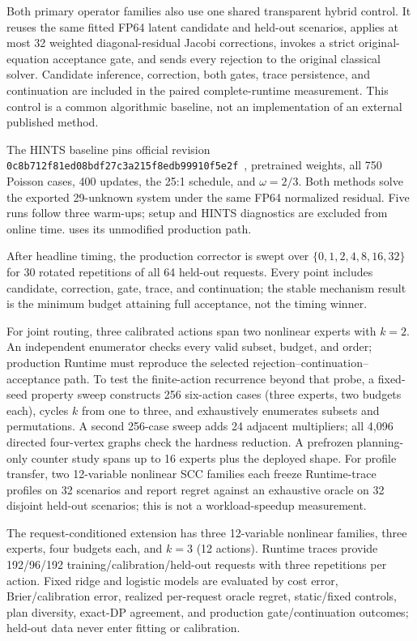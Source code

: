 Both primary operator families also use one shared transparent hybrid control. It
reuses the same fitted FP64 latent candidate and held-out scenarios, applies at most
32 weighted diagonal-residual Jacobi corrections, invokes a strict original-equation
acceptance gate, and sends every rejection to the original classical
solver. Candidate inference, correction, both gates, trace persistence, and continuation
are included in the paired complete-runtime measurement. This control is a common
algorithmic baseline, not an implementation of an external published method.

The HINTS baseline pins official revision
\texttt{0c8b712f81ed08bdf27c3a215f8edb99910f5e2f}~\cite{zhang2024hints}, pretrained
weights, all 750 Poisson cases, 400 updates, the 25:1 schedule, and $\omega=2/3$.
Both methods solve the exported 29-unknown system under the same FP64 normalized
residual. Five runs follow three warm-ups; setup and HINTS diagnostics are excluded
from online time. \system{} uses its unmodified production path.

After headline timing, the production corrector is swept over
$\{0,1,2,4,8,16,32\}$ for 30 rotated repetitions of all 64 held-out requests.
Every point includes candidate, correction, gate, trace, and continuation; the stable
mechanism result is the minimum budget attaining full acceptance, not the timing winner.

For joint routing, three calibrated actions span two nonlinear experts with $k=2$.
An independent enumerator checks every valid subset, budget, and order; production
Runtime must reproduce the selected rejection--continuation--acceptance path. To test
the finite-action recurrence beyond that probe, a fixed-seed property sweep constructs
256 six-action cases (three experts, two budgets each), cycles $k$ from one to three,
and exhaustively enumerates subsets and permutations. A second 256-case sweep adds 24
adjacent multipliers; all 4,096 directed four-vertex graphs check the hardness reduction.
A prefrozen planning-only counter study spans up to 16 experts plus the deployed shape.
For profile transfer, two
12-variable nonlinear SCC families each freeze Runtime-trace
profiles on 32 scenarios and report regret against an exhaustive oracle on 32 disjoint
held-out scenarios; this is not a workload-speedup measurement.

The request-conditioned extension has three 12-variable nonlinear families, three
experts, four budgets each, and $k=3$ (12 actions). Runtime traces provide 192/96/192
training/calibration/held-out requests with three repetitions per action. Fixed ridge
and logistic models are evaluated by cost error, Brier/calibration error, realized
per-request oracle regret, static/fixed controls, plan diversity, exact-DP agreement,
and production gate/continuation outcomes; held-out data never enter fitting or calibration.

